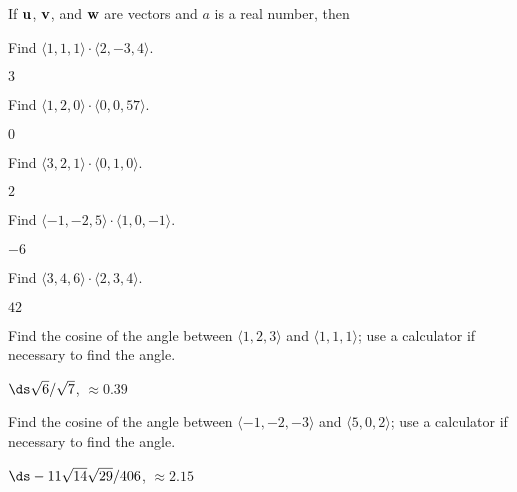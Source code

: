 \begin{theorem}
If ${\bf u}$, ${\bf v}$, and ${\bf w}$ are vectors and $a$ is a real
number, then
\label{thm:dot product properties}


\begin{exercises}

\exercise Find $\langle 1,1,1\rangle\cdot\langle 2,-3,4\rangle$.
\begin{answer} $3$
\end{answer}

\exercise Find $\langle 1,2,0\rangle\cdot\langle 0,0,57\rangle$.
\begin{answer} $0$
\end{answer}

\exercise Find $\langle 3,2,1\rangle\cdot\langle 0,1,0\rangle$.
\begin{answer} $2$
\end{answer}

\exercise Find $\langle -1,-2,5\rangle\cdot\langle 1,0,-1 \rangle$.
\begin{answer} $-6$
\end{answer}

\exercise Find $\langle 3,4,6\rangle\cdot\langle 2,3,4\rangle$.
\begin{answer} $42$
\end{answer}

\exercise Find the cosine of the angle between $\langle 1,2,3\rangle$
and $\langle 1,1,1\rangle$; use a calculator if necessary to find the angle.
\begin{answer} $\ds \sqrt6/\sqrt7$, $\approx 0.39$
\end{answer}

\exercise Find the cosine of the angle between $\langle -1, -2,-3\rangle$
and $\langle 5,0,2\rangle$; use a calculator if necessary to find the angle.
\begin{answer} $\ds -11\sqrt{14}\sqrt{29}/406$, $\approx 2.15$
\end{answer}


\end{exercises}
\end{theorem}
